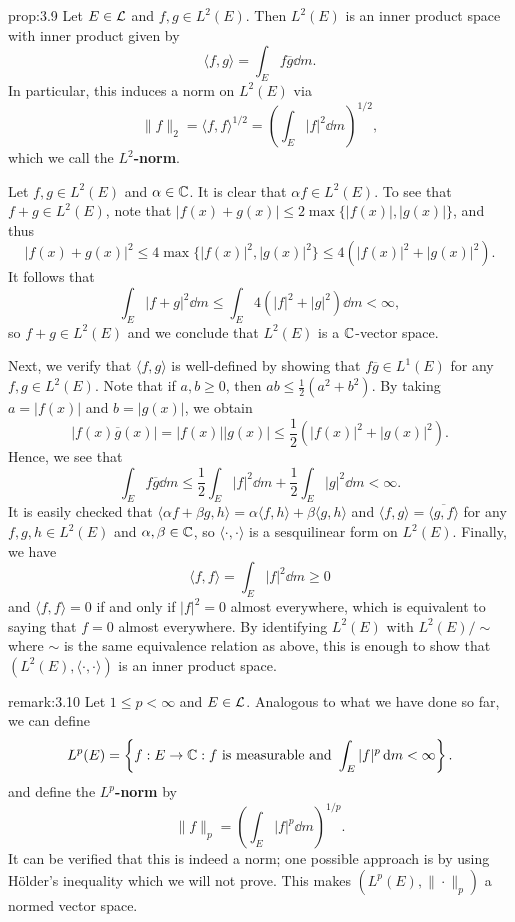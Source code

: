 \begin{prop}{prop:3.9}
    Let $E \in {\cal L}$ and $f, g \in L^2(E)$. Then $L^2(E)$ is an inner 
    product space with inner product given by 
    \[ \langle f, g \rangle = \int_E f\overline g\dd m. \] 
    In particular, this induces a norm on $L^2(E)$ via 
    \[ \|f\|_2 = \langle f, f \rangle^{1/2} = \left( \int_E |f|^2 \dd m 
    \right)^{\!1/2}, \] 
    which we call the {\bf $L^2$-norm}. 
\end{prop}
\begin{pf}
    Let $f, g \in L^2(E)$ and $\alpha \in \mathbb{C}$. It is clear that $\alpha f 
    \in L^2(E)$. To see that $f + g \in L^2(E)$, note that 
    $|f(x) + g(x)| \leq 2\max\{|f(x)|, |g(x)|\}$, and thus 
    \[ |f(x) + g(x)|^2 \leq 4\max\{|f(x)|^2, |g(x)|^2\} 
    \leq 4(|f(x)|^2 + |g(x)|^2). \] 
    It follows that 
    \[ \int_E |f + g|^2\dd m \leq \int_E 4(|f|^2 + |g|^2)\dd m < \infty, \] 
    so $f + g \in L^2(E)$ and we conclude that $L^2(E)$ is a $\mathbb{C}$-vector space. 

    Next, we verify that $\langle f, g \rangle$ is well-defined by 
    showing that $f\overline g \in L^1(E)$ for any $f, g \in L^2(E)$. 
    Note that if $a, b \geq 0$, then $ab \leq \frac12(a^2 + b^2)$. 
    By taking $a = |f(x)|$ and $b = |g(x)|$, we obtain 
    \[ |f(x) \overline g(x)| = |f(x)||g(x)| \leq \frac12(|f(x)|^2 + 
    |g(x)|^2). \] 
    Hence, we see that 
    \[ \int_E f\overline g\dd m \leq \frac12 \int_E |f|^2\dd m 
    + \frac12 \int_E |g|^2\dd m < \infty. \] 
    It is easily checked that $\langle \alpha f + \beta g, h \rangle 
    = \alpha \langle f, h \rangle + \beta \langle g, h \rangle$ 
    and $\langle f, g \rangle = \overline{\langle g, f \rangle}$ 
    for any $f, g, h \in L^2(E)$ and $\alpha, \beta \in \mathbb{C}$, so 
    $\langle \cdot, \cdot \rangle$ is a sesquilinear form on $L^2(E)$. 
    Finally, we have 
    \[ \langle f, f \rangle = \int_E |f|^2 \dd m \geq 0 \] 
    and $\langle f, f \rangle = 0$ if and only if $|f|^2 = 0$ almost 
    everywhere, which is equivalent to saying that $f = 0$ almost everywhere. 
    By identifying $L^2(E)$ with $L^2(E)/\!\sim$ where $\sim$ is the same 
    equivalence relation as above, this is enough to show that 
    $(L^2(E), \langle \cdot, \cdot \rangle)$ is an inner product space. 
\end{pf}

\begin{remark}{remark:3.10}
    Let $1 \leq p < \infty$ and $E \in {\cal L}$. Analogous to 
    what we have done so far, we can define 
    \[ L^p(E) = \left\{ f : E \to \mathbb{C} : f \text{ is measurable and }
    \int_E |f|^p \,\mathrm{d} m < \infty \right\}. \] 
    and define the {\bf $L^p$-norm} by 
    \[ \|f\|_p = \left( \int_E |f|^p \dd m \right)^{\!1/p}. \] 
    It can be verified that this is indeed a norm; one possible approach 
    is by using H\"older's inequality which we will not prove. 
    This makes $(L^p(E), \|\cdot\|_p)$ a normed vector space. 
\end{remark}

